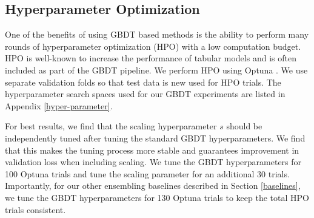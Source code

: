 \begin{table}[H]
\centering
\caption{\textbf{The 16 datasets used in our experiments}}
\label{tab:datasets}
\end{table}

\subsection{Hyperparameter Optimization}
One of the benefits of using GBDT based methods is the ability to perform many rounds of hyperparameter optimization (HPO) with a low computation budget. HPO is well-known to increase the performance of tabular models \citep{gorishniy2021revisiting} and is often included as part of the GBDT pipeline. We perform HPO using Optuna \citep{optuna_2019}. We use separate validation folds so that test data is new used for HPO trials. The hyperparameter search spaces used for our GBDT experiments are listed in Appendix \ref{hyper-parameter}.

For best results, we find that the scaling hyperparameter $s$ should be independently tuned after tuning the standard GBDT hyperparameters. We find that this makes the tuning process more stable and guarantees improvement in validation loss when including scaling. We tune the GBDT hyperparameters for 100 Optuna trials and tune the scaling parameter for an additional 30 trials. Importantly, for our other ensembling baselines described in Section \ref{baselines}, we tune the GBDT hyperparameters for 130 Optuna trials to keep the total HPO trials consistent.


